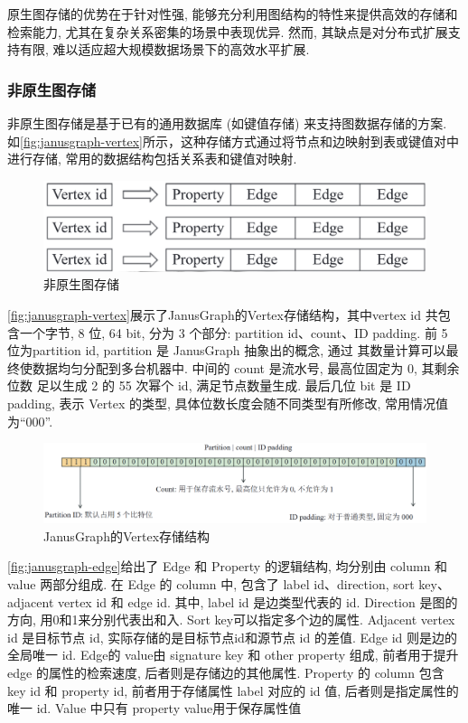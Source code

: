 原生图存储的优势在于针对性强, 能够充分利用图结构的特性来提供高效的存储和检索能力, 尤其在复杂关系密集的场景中表现优异. 然而, 其缺点是对分布式扩展支持有限, 难以适应超大规模数据场景下的高效水平扩展.



\subsubsection*{非原生图存储}

非原生图存储是基于已有的通用数据库 (如键值存储) 来支持图数据存储的方案. 如\autoref{fig:janusgraph-vertex}所示，这种存储方式通过将节点和边映射到表或键值对中进行存储, 常用的数据结构包括关系表和键值对映射.
\begin{figure}[H]
	\centering
	\includegraphics[width=\textwidth]{images/6.png}
	\caption{非原生图存储}
	\label{fig:non-native}
\end{figure}
\autoref{fig:janusgraph-vertex}展示了JanusGraph的Vertex存储结构，其中vertex id 共包含一个字节, 8 位, 64 bit, 分为  3 个部分: partition id、count、ID padding. 前 5 位为partition id, partition 是 JanusGraph 抽象出的概念, 通过  其数量计算可以最终使数据均匀分配到多台机器中.  中间的 count 是流水号, 最高位固定为 0, 其剩余位数  足以生成 2 的 55 次幂个 id, 满足节点数量生成. 最后几位 bit 是 ID padding, 表示 Vertex 的类型, 具体位数长度会随不同类型有所修改, 常用情况值为“000”.
\begin{figure}[H]
	\includegraphics[width=1\textwidth]{images/12.png}
	\caption{JanusGraph的Vertex存储结构}
	\label{fig:janusgraph-vertex}
\end{figure}
\autoref{fig:janusgraph-edge}给出了 Edge 和 Property 的逻辑结构, 均分别由 column 和 value 两部分组成. 在 Edge 的 column 中, 包含了 label id、direction, sort key、adjacent vertex id 和 edge id. 其中, label id 是边类型代表的 id. Direction 是图的方向, 用0和1来分别代表出和入. Sort key可以指定多个边的属性. Adjacent vertex id 是目标节点 id, 实际存储的是目标节点id和源节点 id 的差值. Edge id 则是边的全局唯一 id. Edge的 value由 signature key 和 other property 组成, 前者用于提升 edge 的属性的检索速度, 后者则是存储边的其他属性.  Property 的 column 包含 key id 和 property id, 前者用于存储属性 label 对应的 id 值, 后者则是指定属性的唯一 id. Value 中只有 property value用于保存属性值
